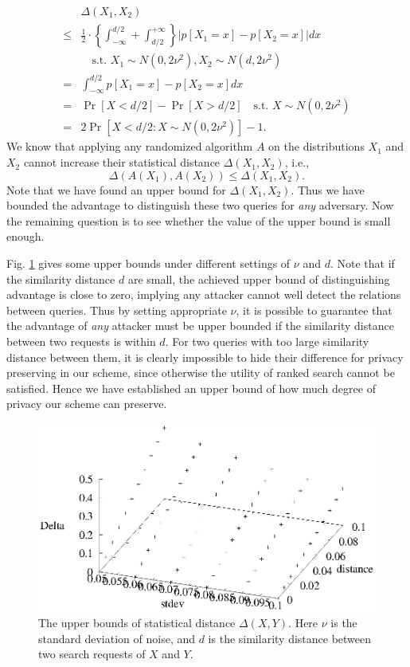\documentclass{IEEEtran}
\begin{document}
$$\begin{aligned}
&\Delta(X_1, X_2) \\
\leq& \frac{1}{2}\cdot\left\{ \int_{-\infty}^{d/2} + \int_{d/2}^{+\infty} \right\} \bigg|p[X_1 = x] - p[X_2 = x]\bigg|dx \\
&\quad \textrm{s.t. } X_1\sim N(0,2\nu^2), X_2\sim N(d,2\nu^2)\\
=& \int_{-\infty}^{d/2} p[X_1 = x] - p[X_2 = x] dx \\
=& \Pr[X<d/2] - \Pr[X>d/2] \quad \textrm{s.t. } X\sim N(0,2\nu^2) \\
=& 2\Pr[X<d/2: X\sim N(0,2\nu^2)]-1.
\end{aligned}$$
We know that applying any randomized algorithm $A$ on the distributions $X_1$ and $X_2$ cannot increase their statistical distance $\Delta(X_1, X_2)$, i.e., 
$$\Delta(A(X_1), A(X_2)) \leq \Delta(X_1, X_2).$$ 
Note that we have found an upper bound for $\Delta(X_1, X_2)$. Thus we have bounded the advantage to distinguish these two queries for \emph{any} adversary. Now the remaining question is to see whether the value of the upper bound is small enough.

Fig. \ref{fig:diff_factors} gives some upper bounds under different settings of $\nu$ and $d$. Note that if the similarity distance $d$ are small, the achieved upper bound of distinguishing advantage is close to zero, implying any attacker cannot well detect the relations between queries. Thus by setting appropriate $\nu$, it is possible to guarantee that the advantage of \emph{any} attacker must be upper bounded if the similarity distance between two requests is within $d$. For two queries with too large similarity distance between them, it is clearly impossible to hide their difference for privacy preserving in our scheme, since otherwise the utility of ranked search cannot be satisfied.
Hence we have established an upper bound of how much degree of privacy our scheme can preserve.

\begin{figure}
\centering
\includegraphics[width=0.8\linewidth]{stdev1samples.eps}
\caption{The upper bounds of statistical distance $\Delta(X, Y)$. Here $\nu$ is the standard deviation of noise, and $d$ is the similarity distance between two search requests of $X$ and $Y$.}
\label{fig:diff_factors}
\end{figure}
\end{document}
